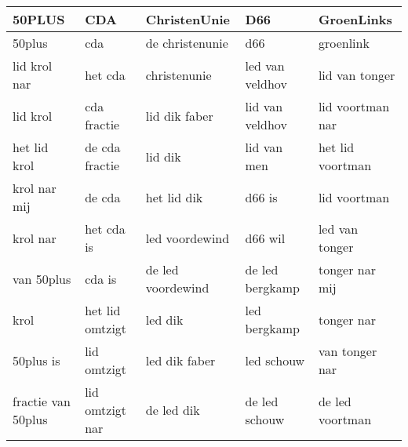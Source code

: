 \begin{tabular}{lllll}
\toprule
             50PLUS &              CDA &       ChristenUnie &              D66 &        GroenLinks \\
\midrule
             50plus &              cda &    de christenunie &              d66 &         groenlink \\
       lid krol nar &          het cda &       christenunie &  led van veldhov &    lid van tonger \\
           lid krol &      cda fractie &      lid dik faber &  lid van veldhov &  lid voortman nar \\
       het lid krol &   de cda fractie &            lid dik &      lid van men &  het lid voortman \\
       krol nar mij &           de cda &        het lid dik &           d66 is &      lid voortman \\
           krol nar &       het cda is &     led voordewind &          d66 wil &    led van tonger \\
         van 50plus &           cda is &  de led voordewind &  de led bergkamp &    tonger nar mij \\
               krol &  het lid omtzigt &            led dik &     led bergkamp &        tonger nar \\
          50plus is &      lid omtzigt &      led dik faber &       led schouw &    van tonger nar \\
 fractie van 50plus &  lid omtzigt nar &         de led dik &    de led schouw &   de led voortman \\
\bottomrule
\end{tabular}
